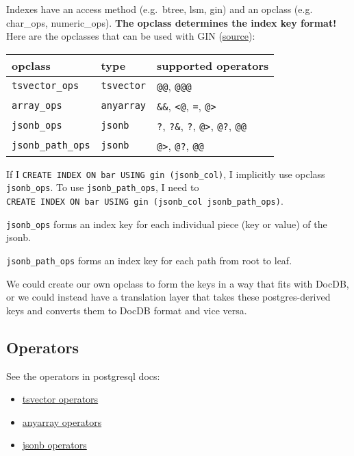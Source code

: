 \documentclass[11pt]{article}
\providecommand{\tightlist}{%
  \setlength{\itemsep}{0pt}\setlength{\parskip}{0pt}}
\begin{document}
Indexes have an access method (e.g.~btree, lsm, gin) and an opclass
(e.g. char\_ops, numeric\_ops). \textbf{The opclass determines the index
key format!} Here are the opclasses that can be used with GIN
(\href{https://www.postgresql.org/docs/current/gin-builtin-opclasses.html}{source}):

\begin{center}
    \begin{tabular}{lll}
        \toprule
        opclass & type & supported operators \\
        \midrule
        \texttt{tsvector\_ops} & \texttt{tsvector} & \texttt{@@},
        \texttt{@@@} \\
        \texttt{array\_ops} & \texttt{anyarray} & \texttt{\&\&},
        \texttt{\textless{}@}, \texttt{=}, \texttt{@\textgreater{}} \\
        \texttt{jsonb\_ops} & \texttt{jsonb} & \texttt{?}, \texttt{?\&},
        \texttt{?\textbar{}}, \texttt{@\textgreater{}}, \texttt{@?},
        \texttt{@@} \\
        \texttt{jsonb\_path\_ops} & \texttt{jsonb} & \texttt{@\textgreater{}},
        \texttt{@?}, \texttt{@@} \\
        \bottomrule
    \end{tabular}
\end{center}

If I \texttt{CREATE\ INDEX\ ON\ bar\ USING\ gin\ (jsonb\_col)}, I
implicitly use opclass \texttt{jsonb\_ops}. To use
\texttt{jsonb\_path\_ops}, I need to
\texttt{CREATE\ INDEX\ ON\ bar\ USING\ gin\ (jsonb\_col\ jsonb\_path\_ops)}.

\texttt{jsonb\_ops} forms an index key for each individual piece (key or
value) of the jsonb.

\texttt{jsonb\_path\_ops} forms an index key for each path from root to
leaf.

We could create our own opclass to form the keys in a way that fits with
DocDB, or we could instead have a translation layer that takes these
postgres-derived keys and converts them to DocDB format and vice versa.

\hypertarget{operators}{%
\subsection{Operators}\label{operators}}

See the operators in postgresql docs:

\begin{itemize}
\tightlist
\item
  \href{https://www.postgresql.org/docs/current/functions-textsearch.html}{tsvector
  operators}
\item
  \href{https://www.postgresql.org/docs/current/functions-array.html}{anyarray
  operators}
\item
  \href{https://www.postgresql.org/docs/current/functions-json.html}{jsonb
  operators}
\end{itemize}
\end{document}
